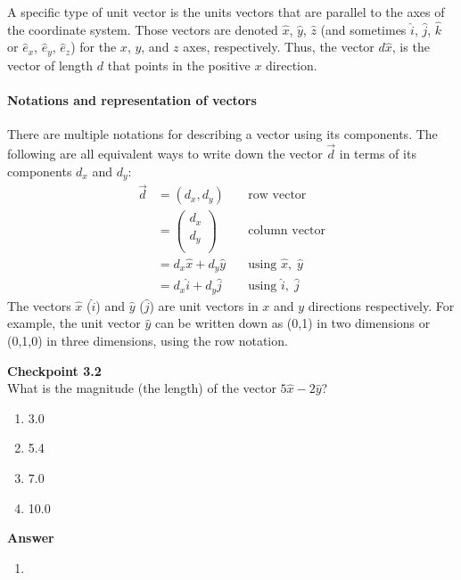A specific type of unit vector is the units vectors that are parallel to the axes of the coordinate system. Those vectors are denoted $\hat x$, $\hat y$, $\hat z$ (and sometimes $\hat i$, $\hat j$, $\hat k$ or $\hat e_x$, $\hat e_y$, $\hat e_z$) for the $x$, $y$, and $z$ axes, respectively. Thus, the vector $d\hat{x}$, is the vector of length $d$ that points in the positive $x$ direction.

\paragraph{Notations and representation of vectors}

There are multiple notations for describing a vector using its components. The following are all equivalent ways to write down the vector $\vec d$ in terms of its components $d_x$ and $d_y$:
\begin{align*}
\vec d &= (d_x,d_y)\quad&\text{row vector}\\
       &=\begin{pmatrix}
           d_x \\
           d_y \\
         \end{pmatrix}\quad&\text{column vector}\\
         &= d_x\hat x +d_y \hat y\quad&\text{using }\hat x,\;\hat y\\
         &=d_x\hat i +d_y \hat j \quad&\text{using }\hat i,\;\hat j
\end{align*}
The vectors $\hat x$ ($\hat i$) and $\hat y$ ($\hat j$) are unit vectors in $x$ and $y$ directions respectively.
For example, the unit vector $\hat y$ can be written down as (0,1) in two dimensions or (0,1,0) in three dimensions, using the row notation.

\begin{framed}
\textbf{Checkpoint 3.2}\\
What is the magnitude (the length) of the vector $5\hat x -2\hat y$?

\begin{enumerate}
\item 3.0
\item 5.4
\item 7.0
\item 10.0
\end{enumerate}

\begin{framed}
\textbf{Answer}\\
\begin{enumerate}[resume]
\item
\end{enumerate}
\end{framed}
\end{framed}


